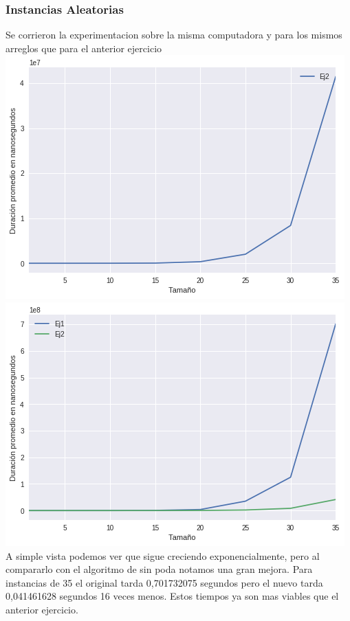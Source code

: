 \subsubsection*{Instancias Aleatorias}
Se corrieron la experimentacion sobre la misma computadora y para los mismos arreglos que para el anterior ejercicio
\includegraphics[scale=0.5]{ej2Random1-40.png}\includegraphics[scale=0.5]{ej12Random1-40.png}\\
A simple vista podemos ver que sigue creciendo exponencialmente, pero al compararlo con el algoritmo de sin poda notamos una gran mejora. Para instancias de 35 el original tarda 0,701732075 segundos pero el nuevo tarda 0,041461628 segundos 16 veces menos. Estos tiempos ya son mas viables que el anterior ejercicio.

   




